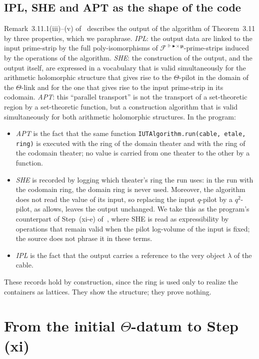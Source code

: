 \documentclass[11pt,a4paper]{article}
\newcommand{\code}[1]{\texttt{#1}}
\begin{document}
\subsection{IPL, SHE and APT as the shape of the code}\label{sec:aptshe}
Remark~3.11.1(iii)--(v) of~\cite{IUT3} describes the output of the algorithm of Theorem~3.11 by three properties,
which we paraphrase. \emph{IPL}: the output data are linked to the input prime-strip by the full
poly-isomorphisms of $\mathcal{F}^{\Vdash\blacktriangleright\times\boldsymbol\mu}$-prime-strips induced by the
operations of the algorithm. \emph{SHE}: the construction of the output, and the output itself, are expressed in a
vocabulary that is valid simultaneously for the arithmetic holomorphic structure that gives rise to the
$\Theta$-pilot in the domain of the $\Theta$-link and for the one that gives rise to the input prime-strip in its
codomain. \emph{APT}: this ``parallel transport'' is not the transport of a set-theoretic region by a
set-theoretic function, but a construction algorithm that is valid simultaneously for both arithmetic holomorphic
structures. In the program:
\begin{itemize}
\item \emph{APT} is the fact that the same function \code{IUTAlgorithm.run(cable, etale, ring)} is executed with
  the ring of the domain theater and with the ring of the codomain theater; no value is carried from one theater
  to the other by a function.
\item \emph{SHE} is recorded by logging which theater's ring the run uses: in the run with the codomain ring, the
  domain ring is never used. Moreover, the algorithm does not read the value of its input, so replacing the input
  $q$-pilot by a $q^2$-pilot, as \cite[Rem.~3.11.1(ii)]{IUT3} allows, leaves the output unchanged. We take this as
  the program's counterpart of Step~(xi-e) of~\cite[Cor.~3.12, proof]{IUT3}, where SHE is read as expressibility by
  operations that remain valid when the pilot log-volume of the input is fixed; the source does not phrase it in
  these terms.
\item \emph{IPL} is the fact that the output carries a reference to the very object $\lambda$ of the cable.
\end{itemize}
These records hold by construction, since the ring is used only to realize the containers as lattices. They show
the structure; they prove nothing.

\section{From the initial \texorpdfstring{$\Theta$}{Theta}-datum to Step (xi)}\label{sec:steps}
\end{document}
